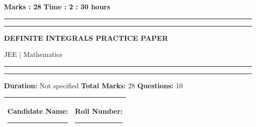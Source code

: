 \documentclass[11pt,a4paper]{article}
\begin{document}
\vspace{2mm}
\noindent \textbf{Marks : 28} \hfill \textbf{Time : 2 : 30 hours}
\noindent\rule{\linewidth}{1.1pt}\vspace{-1mm}\noindent\rule{\linewidth}{0.5pt}
{\centering \Large \textbf{DEFINITE INTEGRALS PRACTICE PAPER}\par}
{\centering JEE $|$ Mathematics\par}
\noindent\rule{\linewidth}{1.1pt}\vspace{-1mm}\noindent\rule{\linewidth}{0.5pt}
\vspace{1mm}
\noindent \textbf{Duration:} Not specified \quad \textbf{Total Marks:} 28 \quad \textbf{Questions:} 10\par
\vspace{2mm}

\begin{tabularx}{\linewidth}{|X|X|}\hline
Candidate Name: \rule{6cm}{0.4pt} & Roll Number: \rule{3.5cm}{0.4pt} \\\hline
\end{tabularx}
\end{document}
